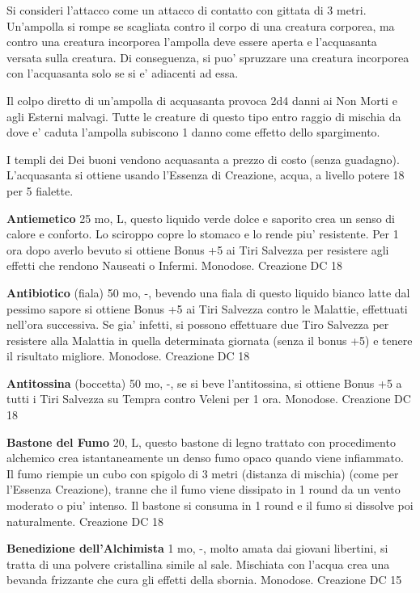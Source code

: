 \documentclass[a4paper,11pt,twoside,openany]{book}
\begin{document}
{Si consideri l'attacco come un attacco di contatto con gittata di 3 metri. Un'ampolla si rompe se scagliata contro il corpo di una creatura corporea, ma contro una creatura incorporea l'ampolla deve essere aperta e l'acquasanta versata sulla creatura. Di conseguenza, si puo' spruzzare una creatura incorporea con l'acquasanta solo se si e' adiacenti ad essa.

Il colpo diretto di un'ampolla di acquasanta provoca 2d4 danni ai Non Morti e agli Esterni malvagi. Tutte le creature di questo tipo entro raggio di mischia da dove e' caduta l'ampolla subiscono 1 danno come effetto dello spargimento.

I templi dei Dei buoni vendono acquasanta a prezzo di costo (senza guadagno). L'acquasanta si ottiene usando l'Essenza di Creazione, acqua, a livello potere 18 per 5 fialette.

\textbf{Antiemetico} 25 mo, L, questo liquido verde dolce e saporito crea un senso di calore e conforto. Lo sciroppo copre lo stomaco e lo rende piu' resistente. Per 1 ora dopo averlo bevuto si ottiene Bonus +5 ai Tiri Salvezza per resistere agli effetti che rendono Nauseati o Infermi. Monodose. Creazione DC 18

\textbf{Antibiotico} (fiala) 50 mo, -,  bevendo una fiala di questo liquido bianco latte dal pessimo sapore si ottiene Bonus +5 ai Tiri Salvezza contro le Malattie, effettuati nell'ora successiva. Se gia' infetti, si possono effettuare due Tiro Salvezza per resistere alla Malattia in quella determinata giornata (senza il bonus +5) e tenere il risultato migliore. Monodose. Creazione DC 18

\textbf{Antitossina} (boccetta) 50 mo, -, se si beve l'antitossina, si ottiene Bonus +5 a tutti i Tiri Salvezza su Tempra contro Veleni per 1 ora. Monodose. Creazione DC 18

\textbf{Bastone del Fumo} 20, L, questo bastone di legno trattato con procedimento alchemico crea istantaneamente un denso fumo opaco quando viene infiammato. Il fumo riempie un cubo con spigolo di 3 metri (distanza di mischia) (come per l'Essenza Creazione), tranne che il fumo viene dissipato in 1 round da un vento moderato o piu' intenso. Il bastone si consuma in 1 round e il fumo si dissolve
poi naturalmente. Creazione DC 18

\textbf{Benedizione dell'Alchimista} 1 mo, -, molto amata dai giovani libertini, si tratta di una polvere cristallina simile al sale. Mischiata con l'acqua crea una bevanda frizzante che cura gli effetti della sbornia. Monodose. Creazione DC 15

}
\end{document}
